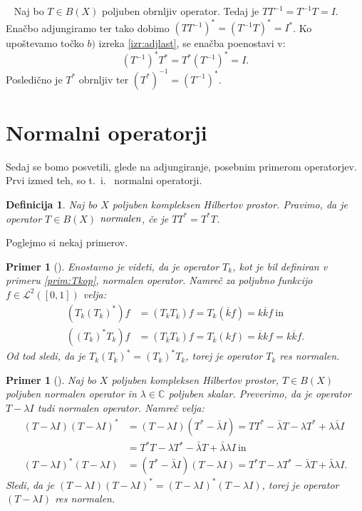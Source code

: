 \documentclass[12pt,a4paper,oneside,fleqn,openany]{book}
\newtheorem{definicija}[izrek]{Definicija}
\newtheorem{primer*}[izrek]{Primer}
\newcommand{\eopf}{\raisebox{0.8ex}{\framebox{}}} %
\newenvironment{dokaz}%
{\noindent{\bf Dokaz.}\ }%
{\hfill\eopf\par\bigskip}%
\newenvironment{primer}[1][]{\begin{primer*}[#1]\renewcommand*{\qedsymbol}{$\diamondsuit$}\pushQED{\qed}}{\popQED\end{primer*}}
\newcommand{\C}{\mathbb{C}}
\newcommand{\pojem}[1]{\ensuremath{\emph{#1}}}
\begin{document}
\begin{dokaz}
	Naj bo $T\in B(X)$ poljuben obrnljiv operator. Tedaj je $TT^{-1} = T^{-1}T = I$. Enačbo adjungiramo ter tako dobimo $(TT^{-1})^* = (T^{-1}T)^* = I^*$. Ko upoštevamo točko $b)$ izreka \ref{izr:adjlast}, se enačba poenostavi v: $$(T^{-1})^*T^* = T^*(T^{-1})^* = I.$$
	Posledično je $T^*$ obrnljiv ter $(T^*)^{-1} = (T^{-1})^*$.
\end{dokaz}

\section[Normalni operatorji]{Normalni operatorji}

Sedaj se bomo posvetili, glede na adjungiranje, posebnim primerom operatorjev. Prvi izmed teh, so t.~i.~ normalni operatorji.

\begin{definicija}
	\label{def:normalop}
	Naj bo $X$ poljuben kompleksen Hilbertov prostor. Pravimo, da je operator $T \in B(X)$ \pojem{normalen}, če je $TT^* = T^*T$.
\end{definicija}
Poglejmo si nekaj primerov.
\begin{primer}
	\label{prim:normalop}
	Enostavno je videti, da je operator $T_k$, kot je bil definiran v primeru \ref{prim:Tkop}, normalen operator. Namreč za poljubno funkcijo $f\in \mathcal{L}^2([0, 1])$ velja:
	\begin{align*}
		(T_k(T_k)^*)f &= (T_kT_{\overline{k}})f =T_k(\overline{k}f) = k\overline{k}f~\text{in} \\
		((T_k)^*T_k)f &= (T_{\overline{k}}T_k)f = T_{\overline{k}}(kf)=\overline{k}kf = k\overline{k}f.
	\end{align*}
	Od tod sledi, da je $T_k(T_k)^* = (T_k)^*T_k$, torej je operator $T_k$ res normalen.
\end{primer}

\begin{primer}
	\label{prim:Tminlamnorm}
	Naj bo $X$ poljuben kompleksen Hilbertov prostor, $T\in B(X)$ poljuben normalen operator in $\lambda\in\C$ poljuben skalar. Preverimo, da je operator $T-\lambda I$ tudi normalen operator. Namreč velja: \begin{align*}
		(T-\lambda I)(T - \lambda I)^* &= (T-\lambda I)(T^*-\bar{\lambda} I)
		= TT^* - \bar{\lambda}T -\lambda T^* + \lambda\bar{\lambda} I \\
		&= T^*T -\lambda T^* -\bar{\lambda}T + \bar{\lambda}\lambda I ~\text{in} \\
		(T-\lambda I)^*(T - \lambda I) &= (T^*-\bar{\lambda} I)(T-\lambda I)
		= T^*T -\lambda T^* -\bar{\lambda}T + \bar{\lambda}\lambda I.
	\end{align*}
	Sledi, da je $(T-\lambda I)(T - \lambda I)^* = (T-\lambda I)^*(T - \lambda I)$, torej je operator $(T-\lambda I)$ res normalen.
\end{primer}
\end{document}
